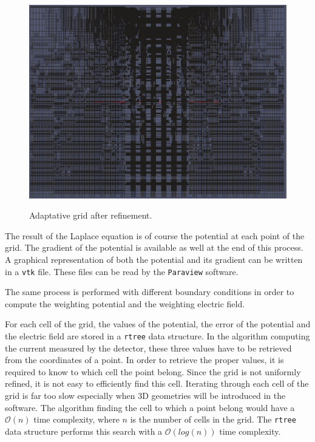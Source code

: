 \documentclass[11pt]{article}
\begin{document}
	\begin{figure}[H]
	  \center
	  \includegraphics[scale=0.3]{images/grid_refinement/high_refinement.png}
	  \label{fig:high_refinement}
	  \caption{Adaptative grid after refinement.}
	\end{figure}

	The result of the Laplace equation is of course the potential at each point of
	the grid. The gradient of the potential is available as well at
	the end of this process. A graphical representation of both the potential and
	its gradient can be written in a \texttt{vtk} file.
	These files can be read by the \texttt{Paraview} software.

	The same process is performed with different boundary conditions in order
	to compute the weighting potential and the weighting electric field.

	For each cell of the grid, the values of the potential, the error of the
	potential and the electric field are stored in a \texttt{rtree} data structure.
	In the algorithm computing the current measured by the detector, these three
	values have to be retrieved from the coordinates of a point. In order to retrieve the proper
	values, it is required to know to which cell the point belong. Since the grid
	is not uniformly refined, it is not easy to efficiently find this cell.
	Iterating through each cell of the grid is far too slow especially when 3D
	geometries will be introduced in the software. The algorithm finding the cell
	to which a point belong would have a $\mathcal{O}(n)$ time complexity, where $n$
	is the number of cells in the grid. The \texttt{rtree} data structure
	performs this search with a $\mathcal{O}(log(n))$ time complexity.
\end{document}
